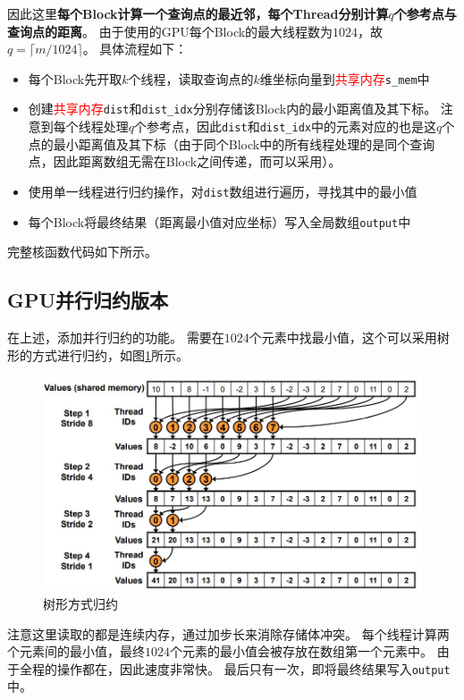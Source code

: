 \documentclass[logo,reportComp]{thesis}
\def\globalmem{\textcolor{black}{\kaiti 全局内存}}
\def\sharedmem{\textcolor{red}{\kaiti 共享内存}}
\begin{document}
因此这里\textbf{每个Block计算一个查询点的最近邻，每个Thread分别计算$q$个参考点与查询点的距离}。
由于使用的GPU每个Block的最大线程数为$1024$，故$q=\lceil m/1024\rceil$。
具体流程如下：
\begin{itemize}
	\item 每个Block先开取$k$个线程，读取查询点的$k$维坐标向量到\sharedmem\verb's_mem'中
	\item 创建\sharedmem\verb'dist'和\verb'dist_idx'分别存储该Block内的最小距离值及其下标。
	注意到每个线程处理$q$个参考点，因此\verb'dist'和\verb'dist_idx'中的元素对应的也是这$q$个点的最小距离值及其下标（由于同个Block中的所有线程处理的是同个查询点，因此距离数组无需在Block之间传递，而可以采用）。
	\item 使用单一线程进行归约操作，对\verb'dist'数组进行遍历，寻找其中的最小值
	\item 每个Block将最终结果（距离最小值对应坐标）写入全局数组\verb'output'中
\end{itemize}

完整核函数代码如下所示。


\subsection{GPU并行归约版本}
在上述，添加并行归约的功能。
需要在$1024$个元素中找最小值，这个可以采用树形的方式进行归约，如图\ref{fig:reduction}所示。
\begin{figure}[H]
\centering
\includegraphics[width=0.8\linewidth]{fig/reduction.jpg}
\caption{树形方式归约}
\label{fig:reduction}
\end{figure}

注意这里读取的都是连续内存，通过加步长来消除存储体冲突。
每个线程计算两个元素间的最小值，最终$1024$个元素的最小值会被存放在数组第一个元素中。
由于全程的操作都在，因此速度非常快。
最后只有一次，即将最终结果写入\verb'output'中。
\end{document}
